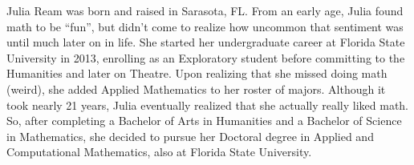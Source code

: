 \documentclass[11pt,expanded,copyright]{fsuthesis}
\begin{document}
\mainmatter








\renewcommand*{\appendixtocname}{Appendices} %
\appendix








\printbibliography

%

\begin{biosketch}
Julia Ream was born and raised in Sarasota, FL. From an early age, Julia found math to be ``fun'', but didn't come to realize how uncommon that sentiment was until much later on in life. She started her undergraduate career at Florida State University in 2013, enrolling as an Exploratory student before committing to the Humanities and later on Theatre. Upon realizing that she missed doing math (weird), she added Applied Mathematics to her roster of majors. Although it took nearly 21 years, Julia eventually realized that she actually really liked math. So, after completing a Bachelor of Arts in Humanities and a Bachelor of Science in Mathematics, she decided to pursue her Doctoral degree in Applied and Computational Mathematics, also at Florida State University. 
\end{biosketch}
\end{document}

